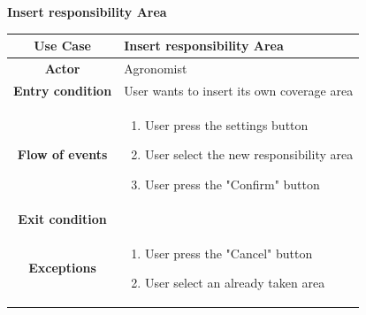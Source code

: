 \documentclass[table, 12pt]{article}
\begin{document}
\begin{itemize}
            \begin{table}[H]
                \item[] \textbf{Insert responsibility Area}
                \item[] 
                \centering
                \begin{tabular}{|c |m{}|}
                    \hline
                    \textbf{Use Case} & Insert responsibility Area\\ \hline
                    \textbf{Actor} & Agronomist\\ \hline
                    \textbf{Entry condition} & User wants to insert its own coverage area\\  \hline
                    \textbf{Flow of events} & \begin{enumerate}
                                                \item User press the settings button
                                                \item User select the new responsibility area
                                                \item User press the "Confirm" button 
                                            \end{enumerate}\\ \hline
                    \textbf{Exit condition} & \\ \hline
                    \textbf{Exceptions} &  \begin{enumerate}
                        \item User press the "Cancel" button
                        \item User select an already taken area
                    \end{enumerate}\\ \hline                    
                \end{tabular}
            \end{table}


\end{itemize}
\end{document}
